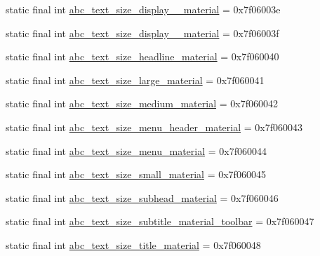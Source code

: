 \begin{DoxyCompactItemize}
\item 
static final int \mbox{\hyperlink{classandroid_1_1support_1_1v7_1_1appcompat_1_1R_1_1dimen_ae98219f74eec556bfe8abdeab1d68bba}{abc\+\_\+text\+\_\+size\+\_\+display\+\_\+\_\+material}} = 0x7f06003e
\item 
static final int \mbox{\hyperlink{classandroid_1_1support_1_1v7_1_1appcompat_1_1R_1_1dimen_a195f9cd8beddae6abfe3c046563048f4}{abc\+\_\+text\+\_\+size\+\_\+display\+\_\+\_\+material}} = 0x7f06003f
\item 
static final int \mbox{\hyperlink{classandroid_1_1support_1_1v7_1_1appcompat_1_1R_1_1dimen_a2a101ceeddd746cea87f31d3de5aa4a5}{abc\+\_\+text\+\_\+size\+\_\+headline\+\_\+material}} = 0x7f060040
\item 
static final int \mbox{\hyperlink{classandroid_1_1support_1_1v7_1_1appcompat_1_1R_1_1dimen_aedc89ce2b273642f5480bd48d7c166b7}{abc\+\_\+text\+\_\+size\+\_\+large\+\_\+material}} = 0x7f060041
\item 
static final int \mbox{\hyperlink{classandroid_1_1support_1_1v7_1_1appcompat_1_1R_1_1dimen_a76406ab43a5bb455ca77ef738ae916e8}{abc\+\_\+text\+\_\+size\+\_\+medium\+\_\+material}} = 0x7f060042
\item 
static final int \mbox{\hyperlink{classandroid_1_1support_1_1v7_1_1appcompat_1_1R_1_1dimen_a5df48e7e501a21c3eb6555a97c883f3a}{abc\+\_\+text\+\_\+size\+\_\+menu\+\_\+header\+\_\+material}} = 0x7f060043
\item 
static final int \mbox{\hyperlink{classandroid_1_1support_1_1v7_1_1appcompat_1_1R_1_1dimen_a013dbf6cc3ed277e44042ef75aac53a0}{abc\+\_\+text\+\_\+size\+\_\+menu\+\_\+material}} = 0x7f060044
\item 
static final int \mbox{\hyperlink{classandroid_1_1support_1_1v7_1_1appcompat_1_1R_1_1dimen_ada53ec83d3d0880e3b4c1f120c5c7907}{abc\+\_\+text\+\_\+size\+\_\+small\+\_\+material}} = 0x7f060045
\item 
static final int \mbox{\hyperlink{classandroid_1_1support_1_1v7_1_1appcompat_1_1R_1_1dimen_a53289079c21fcd186a4164e9b2f2da99}{abc\+\_\+text\+\_\+size\+\_\+subhead\+\_\+material}} = 0x7f060046
\item 
static final int \mbox{\hyperlink{classandroid_1_1support_1_1v7_1_1appcompat_1_1R_1_1dimen_a5bf6baa53b8c1682126087a919610d01}{abc\+\_\+text\+\_\+size\+\_\+subtitle\+\_\+material\+\_\+toolbar}} = 0x7f060047
\item 
static final int \mbox{\hyperlink{classandroid_1_1support_1_1v7_1_1appcompat_1_1R_1_1dimen_a44d7dca8af02a27a8d1dd74e7227c7b3}{abc\+\_\+text\+\_\+size\+\_\+title\+\_\+material}} = 0x7f060048

\end{DoxyCompactItemize}
